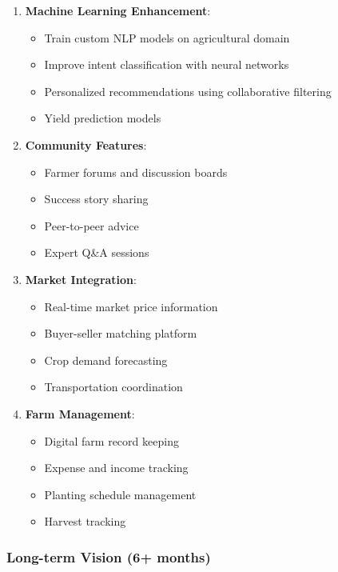 \documentclass[12pt,a4paper]{article}
\begin{document}
\begin{enumerate}[leftmargin=*]
    \item \textbf{Machine Learning Enhancement}:
    \begin{itemize}
        \item Train custom NLP models on agricultural domain
        \item Improve intent classification with neural networks
        \item Personalized recommendations using collaborative filtering
        \item Yield prediction models
    \end{itemize}

    \item \textbf{Community Features}:
    \begin{itemize}
        \item Farmer forums and discussion boards
        \item Success story sharing
        \item Peer-to-peer advice
        \item Expert Q\&A sessions
    \end{itemize}

    \item \textbf{Market Integration}:
    \begin{itemize}
        \item Real-time market price information
        \item Buyer-seller matching platform
        \item Crop demand forecasting
        \item Transportation coordination
    \end{itemize}

    \item \textbf{Farm Management}:
    \begin{itemize}
        \item Digital farm record keeping
        \item Expense and income tracking
        \item Planting schedule management
        \item Harvest tracking
    \end{itemize}
\end{enumerate}

\subsubsection{Long-term Vision (6+ months)}
\end{document}

